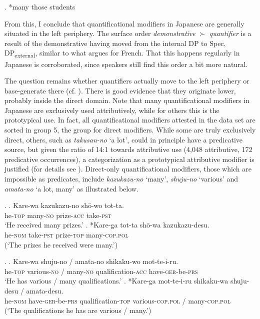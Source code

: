 \ex. *many those students

From this, I conclude that quantificational modifiers in Japanese are generally situated in the left periphery. The surface order \textit{demonstrative} $\succ$ \textit{quantifier} is a result of the demonstrative having moved from the internal DP to Spec, DP\textsubscript{external}, similar to what \citet{laenzlinger:2005:french, laenzlinger:2011:elements} argues for French. That this happens regularly in Japanese is corroborated, since speakers still find this order a bit more natural.

The question remains whether quantifiers actually move to the left periphery or base-generate there (cf. \citealt{kim:2019:syntax}). There is good evidence that they originate lower, probably inside the direct domain. Note that many quantificational modifiers in Japanese are exclusively used attributively, while for others this is the prototypical use. In fact, all quantificational modifiers attested in the data set are sorted in group 5, the group for direct modifiers. While some are truly exclusively direct, others, such as \textit{takusan-no} `a lot’, could in principle have a predicative source, but given the ratio of 14:1 towards attributive use (4,048 attributive, 172 predicative occurrences), a categorization as a prototypical attributive modifier is justified (for details see \citealt{kohlich:2023:suppl}). Direct-only quantificational modifiers, those which are impossible as predicates, include \textit{kazukazu-no} `many’, \textit{shuju-no} `various’ and \textit{amata-no} `a lot, many’ as illustrated below.

\ex. \ag. Kare-wa kazukazu-no shō-wo tot-ta.\\
he-\textsc{top} many-\textsc{no} prize-\textsc{acc} take-\textsc{pst}\\
`He received many prizes.’
\bg. *Kare-ga tot-ta shō-wa kazukazu-desu.\\
he-\textsc{nom} take-\textsc{pst} prize-\textsc{top} many-\textsc{cop.pol}\\
(`The prizes he received were many.’)

\ex. \ag. Kare-wa shuju-no / amata-no shikaku-wo mot-te-i-ru.\\
he-\textsc{top} various-\textsc{no} / many-\textsc{no} qualification-\textsc{acc} have-\textsc{ger}-be-\textsc{prs}\\
`He has various / many qualifications.’
\bg. *Kare-ga mot-te-i-ru shikaku-wa shuju-desu / amata-desu.\\
he-\textsc{nom} have-\textsc{ger}-be-\textsc{prs} qualification-\textsc{top} various-\textsc{cop.pol} / many-\textsc{cop.pol}\\
(`The qualifications he has are various / many.’)

